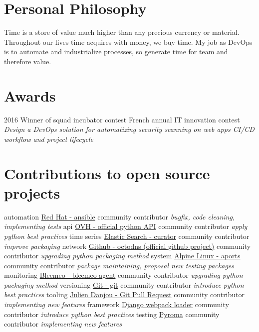 \documentclass[]{friggeri-cv}
\begin{document}
\section{Personal Philosophy}
    Time is a store of value much higher than any precious currency or
    material. Throughout our lives time acquires with money, we buy time.
    My job as DevOps is to automate and industrialize processes,
    so generate time for team and therefore value.

\section{Awards}
\begin{entrylist}
    \entry
        {2016}
        {Winner of squad incubator contest}
        {French annual IT innovation contest}
        {\emph{Design a DevOps solution for automatizing security scanning on
        web apps CI/CD workflow and project lifecycle}}
\end{entrylist}

\section{Contributions to open source projects}
\begin{entrylist}
    \entry
        {automation}
        {\href{https://github.com/ansible/ansible}{Red Hat - ansible}}
        {community contributor}
        {\emph{bugfix, code cleaning, implementing tests}}
    \entry
        {api}
        {\href{https://github.com/ovh/python-ovh}{OVH - official python API}}
        {community contributor}
        {\emph{apply python best practices}}
    \entry
        {time series}
        {\href{https://github.com/ovh/python-ovh}{Elastic Search - curator}}
        {community contributor}
        {\emph{improve packaging}}
    \entry
        {network}
        {\href{https://github.com/github/octodns}{Github - octodns (official github project)}}
        {community contributor}
        {\emph{upgrading python packaging method}}
    \entry
        {system}
        {\href{https://github.com/alpinelinux/aports}{Alpine Linux - aports}}
        {community contributor}
        {\emph{package maintaining, proposal new testing packages}}
    \entry
        {monitoring}
        {\href{https://github.com/bleemeo/bleemeo-agent}{Bleemeo - bleemeo-agent}}
        {community contributor}
        {\emph{upgrading python packaging method}}
    \entry
        {versioning}
        {\href{https://github.com/git/git}{Git - git}}
        {community contributor}
        {\emph{introduce python best practices}}
    \entry
        {tooling}
        {\href{https://github.com/jd/git-pull-request}{Julien Danjou - Git Pull Request}}
        {community contributor}
        {\emph{implementing new features}}
    \entry
        {framework}
        {\href{https://github.com/owais/django-webpack-loader}{Django webpack loader}}
        {community contributor}
        {\emph{introduce python best practices}}
    \entry
        {testing}
        {\href{https://github.com/regebro/pyroma}{Pyroma}}
        {community contributor}
        {\emph{implementing new features}}
\end{entrylist}
\end{document}
